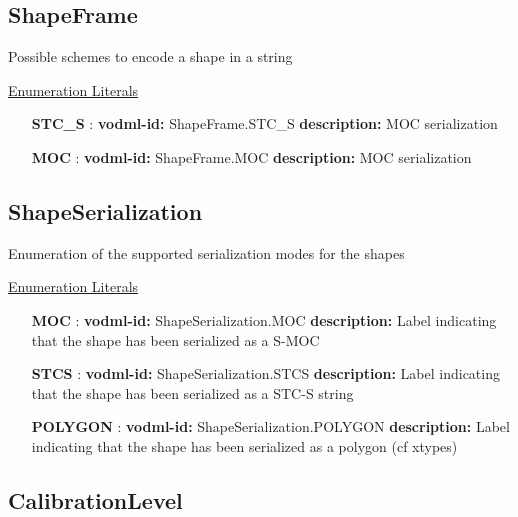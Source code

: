   \subsection{ShapeFrame}
  \label{sect:ShapeFrame}

  Possible schemes to encode a shape in a string

  \noindent \underline{Enumeration Literals}
  \vspace{-\parsep}
  \small
  \begin{itemize}
  
    \item[\textbf{STC\_S}]: \textbf{vodml-id:} ShapeFrame.STC\_S \newline
          \textbf{description:} MOC serialization
    \item[\textbf{MOC}]: \textbf{vodml-id:} ShapeFrame.MOC \newline
          \textbf{description:} MOC serialization
  \end{itemize}
  \normalsize


  \subsection{ShapeSerialization}
  \label{sect:ShapeSerialization}

  Enumeration of the supported serialization modes for the shapes

  \noindent \underline{Enumeration Literals}
  \vspace{-\parsep}
  \small
  \begin{itemize}
  
    \item[\textbf{MOC}]: \textbf{vodml-id:} ShapeSerialization.MOC \newline
          \textbf{description:} Label indicating that the shape has been serialized as a S-MOC
    \item[\textbf{STCS}]: \textbf{vodml-id:} ShapeSerialization.STCS \newline
          \textbf{description:} Label indicating that the shape has been serialized as a STC-S \citep{2007ivoa.spec.1030R} string
    \item[\textbf{POLYGON}]: \textbf{vodml-id:} ShapeSerialization.POLYGON \newline
          \textbf{description:} Label indicating that the shape has been serialized as a polygon (cf xtypes)
  \end{itemize}
  \normalsize


  \subsection{CalibrationLevel}
  \label{sect:CalibrationLevel}

